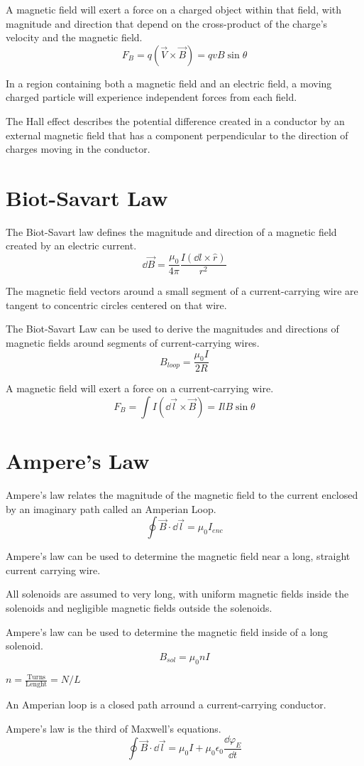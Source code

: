\documentclass[../em.tex]{subfiles}
\begin{document}
A magnetic field will exert a force on a charged object within that field, with magnitude and direction that depend on the cross-product of the charge's velocity and the magnetic field.
\[ F_B = q(\vec{V}\times \vec{B})=qvB\sin\theta \]

In a region containing both a magnetic field and an electric field, a moving charged particle will experience independent forces from each field.

The Hall effect describes the potential difference created in a conductor by an external magnetic field that has a component perpendicular to the direction of charges moving in the conductor.
\section{Biot-Savart Law}
The Biot-Savart law defines the magnitude and direction of a magnetic field created by an electric current.
\[ \dd \vec{B} = \frac{\mu_0}{4\pi} \frac{I(\dd l\times \hat{r})}{r^2} \]

The magnetic field vectors around a small segment of a current-carrying wire are tangent to concentric circles centered on that wire.

The Biot-Savart Law can be used to derive the magnitudes and directions of magnetic fields around segments of current-carrying wires.
\[ B_{loop} = \frac{\mu_0 I}{2R} \]

A magnetic field will exert a force on a current-carrying wire.
\[ F_B = \int I(\dd \vec{l}\times \vec{B}) = IlB\sin\theta \]

\section{Ampere's Law}
Ampere's law relates the magnitude of the magnetic field to the current enclosed by an imaginary path called an Amperian Loop.
\[\oint \vec{B}\cdot \dd \vec{l} = \mu_0 I_{enc} \]

Ampere's law can be used to determine the magnetic field near a long, straight current carrying wire.

All solenoids are assumed to very long, with uniform magnetic fields inside the solenoids and negligible magnetic fields outside the solenoids.

Ampere's law can be used to determine the magnetic field inside of a long solenoid.
\[ B_{sol} = \mu_0 nI\]

$n = \frac{\text{Turns}}{\text{Lenght}} = N/L$

An Amperian loop is a closed path arround a current-carrying conductor.

Ampere's law is the third of Maxwell's equations.
\[ \oint \vec{B} \cdot \dd \vec{l} = \mu_0 I + \mu_0 \epsilon_0 \frac{\dd\varphi_E}{\dd t}\]
\end{document}
